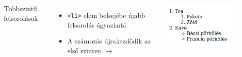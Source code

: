 \begin{frame}
  \begin{columns}[T]
      Többszintű felsorolások
      \begin{itemize}
        \item \texttt{<li>} elem belsejébe újabb felsorolás ágyazható
        \item A számozás újrakezdődik az első szinten $\to$ 
      \end{itemize}
      \vfill
      \centering \includegraphics[width=\textwidth]{tobbszintu.png}
      \begin{exampleblock}{}
        \scriptsize
        
      \end{exampleblock}
  \end{columns}
\end{frame}

